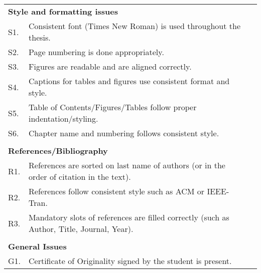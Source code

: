 \begin{table}[]
\begin{tabular}{lll}
\multicolumn{2}{l}{\textbf{Style and formatting issues}}                                                                         &  \\
S1.            & Consistent font (Times New Roman) is   used throughout the thesis.                                              &  \\
S2.            & Page numbering is   done appropriately.                                                                         &  \\
S3.            & Figures are readable   and are aligned correctly.                                                               &  \\
S4.            & Captions for tables   and figures use consistent format and style.                                              &  \\
S5.            & Table of   Contents/Figures/Tables follow proper indentation/styling.                                           &  \\
S6.            & Chapter name and   numbering follows consistent style.                                                          &  \\
               &                                                                                                                 &  \\
\multicolumn{2}{l}{\textbf{References/Bibliography}}                                                                             &  \\
R1.            & References are   sorted on last name of authors (or in the order of citation in the text).                      &  \\
R2.            & References follow   consistent style such as ACM or IEEE-Tran.                                                  &  \\
R3.            & Mandatory slots of   references are filled correctly (such as Author, Title, Journal, Year).                    &  \\
               &                                                                                                                 &  \\
\multicolumn{2}{l}{\textbf{General Issues}}                                                                                      &  \\
G1.            & Certificate of Originality signed by   the student is present.                                                  &  \\

\end{tabular}
\end{table}
